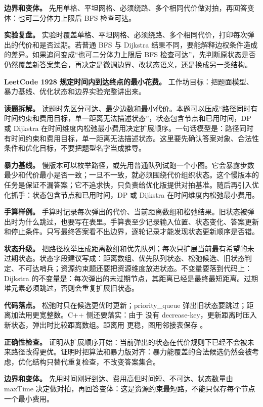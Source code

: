 \textbf{边界和变体。} 先用单格、平坦网格、必须绕路、多个相同代价做对拍，再回答变体：也可二分体力上限后 BFS 检查可达。

\textbf{实验复盘。} 实验时覆盖单格、平坦网格、必须绕路、多个相同代价，打印每次弹出的代价和是否过期。若普通 BFS 与 Dijkstra 结果不同，要能解释边权条件造成的差异。如果追问变成“也可二分体力上限后 BFS 检查可达”，先判断原状态是否仍然覆盖新答案集合，再决定是微调边界、改状态语义，还是换成另一类结构。

\noindent\textbf{LeetCode 1928 规定时间内到达终点的最小花费。} 工作坊目标：把题面模型、暴力基线、优化状态和边界实验完整讲出来。

\textbf{读题拆解。} 读题时先区分可达、最少边数和最小代价。本题可以压成“路径同时有时间约束和费用目标，单一距离无法描述状态”，状态包含节点和已用时间，DP 或 Dijkstra 在时间维度内松弛最小费用决定扩展顺序。一句话模型是：路径同时有时间约束和费用目标，单一距离无法描述状态。这里要先确认答案对象、合法性条件和优化目标，不要把题型名字当成推导。

\textbf{暴力基线。} 慢版本可以枚举路径，或先用普通队列试跑一个小图。它会暴露步数最少和代价最小是否一致；一旦不一致，就必须围绕代价组织状态。这个慢版本的任务是保证不漏答案；它不追求快，只负责给优化版提供对拍基准。随后再引入优化抓手：状态包含节点和已用时间，DP 或 Dijkstra 在时间维度内松弛最小费用。

\textbf{手算样例。} 手算时记录每次弹出的代价、当前距离数组和松弛结果。旧状态被弹出时为什么跳过，也要写在表里。手算表至少记录输入位置、状态变化、答案更新和停止条件。只写最终答案看不出边界，逐轮记录才能发现状态更新顺序是否错。

\textbf{状态升级。} 把路径枚举压成距离数组和优先队列；每次只扩展当前最有希望的未过期状态。状态字段建议写成：距离数组、优先队列状态、松弛候选、旧状态判定、不可达哨兵；资源约束题还要把资源维度放进状态。不变量要落到代码上：Dijkstra 的不变量是：每次弹出的未过期节点，其距离已经是最终最短距离。过期堆元素必须跳过，否则会重复扩展旧状态。

\textbf{代码落点。} 松弛时只在候选更优时更新；priority\_queue 弹出旧状态要跳过；距离加法用更宽整数。C++ 侧还要落实：由于  没有 decrease-key，更新距离时压入新状态，弹出时比较距离数组。距离用  更稳，图用邻接表保存 。

\textbf{正确性检查。} 证明从扩展顺序开始：当前弹出的状态在代价规则下已经不会被未来路径改得更优。证明时把算法和暴力版对齐：暴力能覆盖的合法候选仍然会被考虑，优化结构只替代重复检查，不改变答案集合。

\textbf{边界和变体。} 先用时间刚好到达、费用高但时间短、不可达、状态数量由 maxTime 决定做对拍，再回答变体：这是资源约束最短路，不能只保存每个节点一个最小费用。

